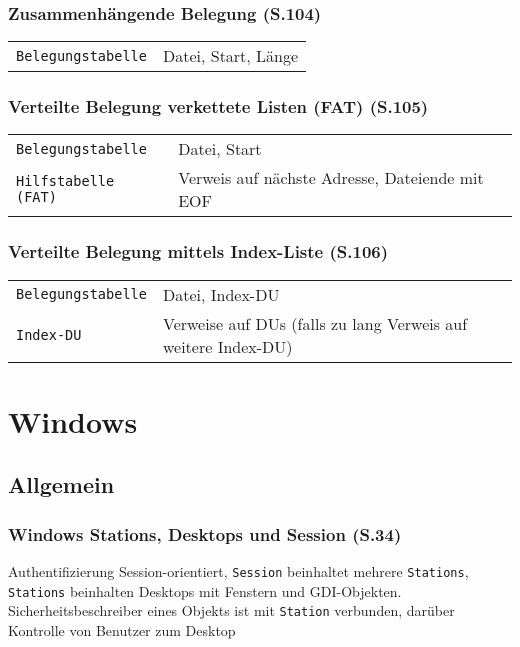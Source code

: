 \begin{multicols}{3}
\subsubsection{Zusammenhängende Belegung (S.104)}
\begin{tabular}{@{}p{\the\MyLen}@{}%
		@{}p{\linewidth-\the\MyLen}@{}}
\texttt{Belegungstabelle} & Datei, Start, Länge\\
\end{tabular}

\subsubsection{Verteilte Belegung verkettete Listen (FAT) (S.105)}
\begin{tabular}{@{}p{\the\MyLen}@{}%
		@{}p{\linewidth-\the\MyLen}@{}}
	\texttt{Belegungstabelle} & Datei, Start\\
	\texttt{Hilfstabelle (FAT)} & Verweis auf nächste Adresse, Dateiende mit EOF\\
\end{tabular}

\subsubsection{Verteilte Belegung mittels Index-Liste (S.106)}
\begin{tabular}{@{}p{\the\MyLen}@{}%
		@{}p{\linewidth-\the\MyLen}@{}}
	\texttt{Belegungstabelle} & Datei, Index-DU\\
	\texttt{Index-DU} & Verweise auf DUs (falls zu lang Verweis auf weitere Index-DU)\\
\end{tabular}


\section{Windows}

\subsection{Allgemein}
\subsubsection{Windows Stations, Desktops und Session (S.34)}
Authentifizierung Session-orientiert, \texttt{Session} beinhaltet mehrere \texttt{Stations}, \texttt{Stations} beinhalten Desktops mit Fenstern und GDI-Objekten. Sicherheitsbeschreiber eines Objekts ist mit \texttt{Station} verbunden, darüber Kontrolle von Benutzer zum Desktop


\end{multicols}
